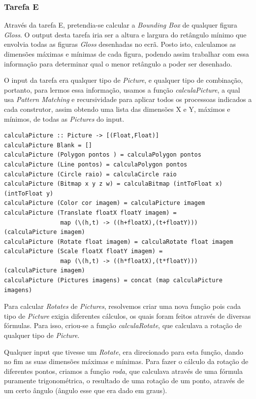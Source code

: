 \documentclass[a4paper]{article}
\begin{document}
\subsubsection{Tarefa E}

Através da tarefa E, pretendia-se calcular a \textit{Bounding Box} de qualquer figura \textit{Gloss}. O output desta tarefa iria ser a altura e largura do retângulo mínimo que envolvia todas as figuras \textit{Gloss} desenhadas no ecrã. Posto isto, calculamos as dimensões máximas e mínimas de cada figura, podendo assim trabalhar com essa informação para determinar qual o menor retângulo a poder ser desenhado. \par 
O input da tarefa era qualquer tipo de \textit{Picture}, e qualquer tipo de combinação, portanto, para lermos essa informação, usamos a função \textit{calculaPicture}, a qual usa \textit{Pattern Matching} e recursividade para aplicar todos os processoas indicados a cada construtor, assim obtendo uma lista das dimensões X e Y, máximos e mínimos, de todas as \textit{Pictures} do input. \par

\begin{Verbatim}[fontsize=\small]
calculaPicture :: Picture -> [(Float,Float)]
calculaPicture Blank = []
calculaPicture (Polygon pontos ) = calculaPolygon pontos
calculaPicture (Line pontos) = calculaPolygon pontos
calculaPicture (Circle raio) = calculaCircle raio
calculaPicture (Bitmap x y z w) = calculaBitmap (intToFloat x) (intToFloat y) 
calculaPicture (Color cor imagem) = calculaPicture imagem
calculaPicture (Translate floatX floatY imagem) = 
                map (\(h,t) -> ((h+floatX),(t+floatY))) (calculaPicture imagem)
calculaPicture (Rotate float imagem) = calculaRotate float imagem
calculaPicture (Scale floatX floatY imagem) = 
                map (\(h,t) -> ((h*floatX),(t*floatY))) (calculaPicture imagem)
calculaPicture (Pictures imagens) = concat (map calculaPicture imagens)

\end{Verbatim}


Para calcular \textit{Rotates} de \textit{Pictures}, resolvemos criar uma nova função pois cada tipo de \textit{Picture} exigia diferentes cálculos, os quais foram feitos através de diversas fórmulas. Para isso, criou-se a função \textit{calculaRotate}, que calculava a rotação de qualquer tipo de \textit{Picture}. \par
Qualquer input que tivesse um \textit{Rotate}, era direcionado para esta função, dando no fim as suas dimensões máximas e mínimas. Para fazer o cálculo da rotação de diferentes pontos, criamos a função \textit{roda}, que calculava através de uma fórmula puramente trigonométrica, o resultado de uma rotação de um ponto, através de um certo ângulo (ângulo esse que era dado em graus). 
\end{document}
